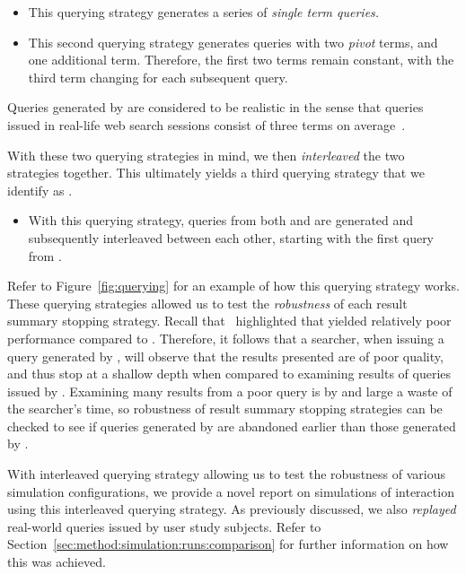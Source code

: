 \begin{itemize}
    \item{ This querying strategy generates a series of \emph{single term queries.}}
    \item{ This second querying strategy generates queries with two \emph{pivot} terms, and one additional term. Therefore, the first two terms remain constant, with the third term changing for each subsequent query.}
\end{itemize}

Queries generated by  are considered to be realistic in the sense that queries issued in real-life web search sessions consist of three terms on average~\citep{keskustalo2009querying}.

With these two querying strategies in mind, we then \emph{interleaved} the two strategies together. This ultimately yields a third querying strategy that we identify as .

\begin{itemize}
    \item{ With this querying strategy, queries from both  and  are generated and subsequently interleaved between each other, starting with the first query from .}
\end{itemize}

Refer to Figure~\ref{fig:querying} for an example of how this querying strategy works. These querying strategies allowed us to test the \emph{robustness} of each result summary stopping strategy. Recall that~\cite{keskustalo2009querying} highlighted that  yielded relatively poor performance compared to . Therefore, it follows that a searcher, when issuing a query generated by , will observe that the results presented are of poor quality, and thus stop at a shallow depth when compared to examining results of queries issued by . Examining many results from a poor query is by and large a waste of the searcher's time, so robustness of result summary stopping strategies can be checked to see if queries generated by  are abandoned earlier than those generated by .

With interleaved querying strategy  allowing us to test the robustness of various simulation configurations, we provide a novel report on simulations of interaction using this interleaved querying strategy. As previously discussed, we also \emph{replayed} real-world queries issued by user study subjects. Refer to Section~\ref{sec:method:simulation:runs:comparison} for further information on how this was achieved.

